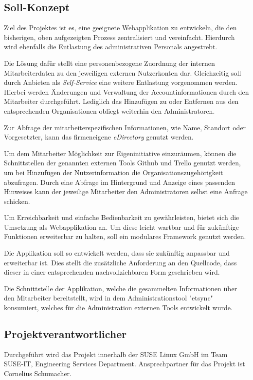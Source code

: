\subsection{Soll-Konzept}
\label{sec:Soll-Konzept}
Ziel des Projektes ist es, eine geeignete Webapplikation zu entwickeln,
die den bisherigen, oben aufgezeigten Prozess zentralisiert und vereinfacht.
Hierdurch wird ebenfalls die Entlastung des administrativen Personals angestrebt.

Die Lösung dafür stellt eine personenbezogene Zuordnung der internen Mitarbeiterdaten zu den jeweiligen
externen Nutzerkonten dar. Gleichzeitig soll durch Anbieten als \textit{Self-Service} eine weitere
Entlastung vorgenommen werden. Hierbei werden Änderungen und Verwaltung der Accountinformationen durch den Mitarbeiter
durchgeführt. Lediglich das Hinzufügen zu oder Entfernen aus den entsprechenden Organisationen obliegt weiterhin den
Administratoren.

Zur Abfrage der mitarbeiterspezifischen Informationen, wie Name, Standort oder Vorgesetzter, kann
das firmeneigene \textit{eDirectory} genutzt werden.

Um dem Mitarbeiter Möglichkeit zur Eigeninitiative einzuräumen, können die Schnittstellen der
genannten externen Tools Github und Trello genutzt werden, um bei Hinzufügen der Nutzerinformation
die Organisationszugehörigkeit abzufragen. Durch eine Abfrage im Hintergrund und Anzeige eines
passenden Hinweises kann der jeweilige Mitarbeiter den Administratoren selbst eine Anfrage schicken.

Um Erreichbarkeit und einfache Bedienbarkeit zu gewährleisten, bietet sich die Umsetzung als
Webapplikation an. Um diese leicht wartbar und für zukünftige Funktionen erweiterbar zu halten, soll
ein modulares Framework genutzt werden.

Die Applikation soll so entwickelt werden, dass sie zukünftig anpassbar und erweiterbar ist. Dies
stellt die zusätzliche Anforderung an den Quellcode, dass dieser in einer entsprechenden nachvollziehbaren
Form geschrieben wird.

Die Schnittstelle der Applikation, welche die gesammelten Informationen über den Mitarbeiter
bereitstellt, wird in dem Administrationstool "etsync" konsumiert, welches für die Administration
externen Tools entwickelt wurde.

\subsection{Projektverantwortlicher}
\label{sec:Projektverantwortlicher}
Durchgeführt wird das Projekt innerhalb der SUSE Linux GmbH im Team SUSE-IT, Engineering Services
Department. Ansprechpartner für das Projekt ist Cornelius Schumacher.

